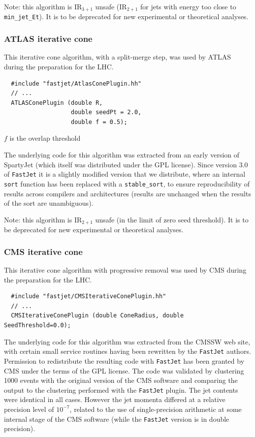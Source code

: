 \documentclass[12pt,a4]{article}
\newcommand{\fastjet}{\texttt{FastJet}\xspace}
\newcommand{\ttt}[1]{{\small\texttt{#1}}}
\begin{document}
Note: this algorithm is IR$_{3+1}$ unsafe (IR$_{2+1}$ for jets with
energy too close to \verb:min_jet_Et:). It is to be deprecated for new
experimental or theoretical analyses.

\subsubsection{ATLAS iterative cone}
%
This iterative cone algorithm, with a split-merge step, was used by
ATLAS during the preparation for the LHC.
\begin{lstlisting}
  #include "fastjet/AtlasConePlugin.hh"
  // ...
  ATLASConePlugin (double R, 
                   double seedPt = 2.0, 
                   double f = 0.5);
\end{lstlisting}
$f$ is the overlap threshold

The underlying code for this algorithm was extracted from an early
version of SpartyJet \cite{SpartyJet} (which itself was distributed
under the GPL license).
%
Since version 3.0 of \fastjet it is a slightly modified version that
we distribute, where an internal \ttt{sort} function has been replaced
with a \ttt{stable\_sort}, to ensure reproducibility of results across
compilers and architectures (results are unchanged when the results of
the sort are unambiguous).

Note: this algorithm is IR$_{2+1}$ unsafe (in the limit of zero seed
threshold). It is to be deprecated for new experimental or theoretical
analyses.

\subsubsection{CMS iterative cone}
%
This iterative cone algorithm with progressive removal was used by CMS
during the preparation for the LHC.
\begin{lstlisting}
  #include "fastjet/CMSIterativeConePlugin.hh"
  // ...
  CMSIterativeConePlugin (double ConeRadius, double SeedThreshold=0.0);
\end{lstlisting}


The underlying code for this algorithm was extracted from the CMSSW
web site, with certain small service routines having been rewritten by
the \fastjet authors. 
%
Permission to redistribute the resulting code with \fastjet has been
granted by CMS under the terms of the GPL license.
%
The code was validated by clustering 1000 events with the original
version of the CMS software and comparing the output to the clustering
performed with the \fastjet plugin.
%
The jet contents were identical in all cases. However the jet momenta
differed at a relative precision level of $10^{-7}$, related to the
use of single-precision arithmetic at some internal stage of the CMS
software (while the \fastjet version is in double precision).
\end{document}
